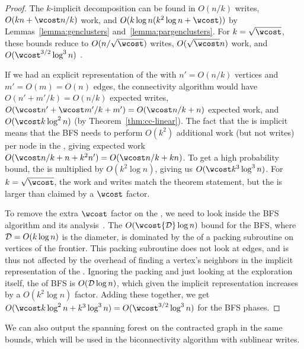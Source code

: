 \begin{proof}%
  The $k$-implicit decomposition can be found in $O(n/k)$ writes,
  $O(kn + \wcost n/ k)$ work, and $O(k\log n(k^2\log n + \wcost))$
  \depth{} by Lemmas~\ref{lemma:genclusters}
  and~\ref{lemma:pargenclusters}.  For $k=\sqrt{\wcost}$, these bounds
  reduce to $O(n/\sqrt{\wcost})$ writes, $O(\sqrt{\wcost} n)$ work, and
  $O(\wcost^{3/2}\log^3n)$ \depth{}.

  If we had an explicit representation of the \clustergraph{} with
  $n'=O(n/k)$ vertices and $m' = O(m) = O(n)$ edges, the connectivity
  algorithm would have $O(n'+m'/k) = O(n/k)$ expected writes,
  $O(\wcost n' + \wcost m' / k + m') = O(\wcost n/k + n)$ expected
  work, and $O(\wcost k \log^2n)$ \depth{} \whp{} (by
  Theorem~\ref{thm:cc-linear}).  The fact that the \clustergraph{} is
  implicit means that the BFS needs to perform $O(k^2)$ additional
  work (but not writes) per node in the \clustergraph{}, giving
  expected work $O(\wcost n/k + n + k^2n') = O(\wcost n /k + kn)$.  To
  get a high probability bound, the \depth{} is multiplied by
  $O(k^2\log n)$, giving us $O(\wcost k^3 \log^3 n)$.  For
  $k=\sqrt{\wcost}$, the work and writes match the theorem statement,
  but the \depth{} is larger than claimed by a $\wcost$ factor.

  To remove the extra $\wcost$ factor on the \depth{}, we need to look
  inside the BFS algorithm and its analysis~\cite{BBFGGMS16}.  The
  $O(\wcost {\cal D} \log n)$ \depth{} bound for the BFS, where ${\cal
    D} = O(k\log n)$ is the diameter, is dominated by the \depth{} of
  a packing subroutine on vertices of the frontier.  This packing
  subroutine does not look at edges, and is thus not affected by the
  overhead of finding a vertex's neighbors in the implicit
  representation of the \clustergraph{}.  Ignoring the packing and
  just looking at the exploration itself, the \depth{} of BFS is
  $O({\cal D} \log n)$, which given the implicit representation
  increases by a $O(k^2 \log n)$ factor.  Adding these together, we
  get \depth{} $O(\wcost k \log^2 n + k^3 \log^3 n) =
  O(\wcost^{3/2}\log^3n)$ for the BFS phases.
\end{proof}



We can also output the spanning forest on the contracted graph in the
same bounds, which will be used in the biconnectivity algorithm with
sublinear writes.

